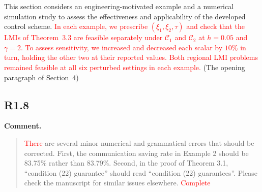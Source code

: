 \documentclass[12pt,a4paper]{article}
\begin{document}
\noindent This section considers an engineering-motivated example and a numerical simulation study to assess the effectiveness and applicability of the developed control scheme. \textcolor{red}{In each example, we prescribe $(\xi_1,\xi_2,\tau)$ and check that the LMIs of Theorem~3.3 are feasible separately under $\mathcal C_1$ and $\mathcal C_2$ at $h=0.05$ and $\gamma=2$. To assess sensitivity, we increased and decreased each scalar by $10\%$ in turn, holding the other two at their reported values. Both regional LMI problems remained feasible at all six perturbed settings in each example.} (The opening paragraph of Section~4)\par
\endgroup
%
%

\subsection*{R1.8}

\textbf{Comment.}
\begin{quote}
\raggedright
\textcolor{red}{There} are several minor numerical and grammatical errors that should be corrected. First, the communication saving rate in Example 2 should be 83.75\% rather than 83.79\%. Second, in the proof of Theorem 3.1, ``condition (22) guarantee'' should read ``condition (22) guarantees''. Please check the manuscript for similar issues elsewhere. \textcolor{red}{Complete}
\end{quote}
\end{document}

